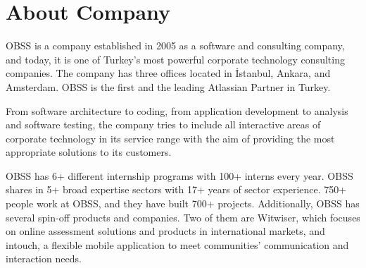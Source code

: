 \section{About Company}

OBSS is a company established in 2005 as a software and consulting company, and today, it is one of Turkey's most powerful corporate technology consulting companies. The company has three offices located in İstanbul, Ankara, and Amsterdam. OBSS is the first and the leading Atlassian Partner in Turkey.

From software architecture to coding, from application development to analysis and software testing, the company tries to include all interactive areas of corporate technology in its service range with the aim of providing the most appropriate solutions to its customers.

OBSS has 6+ different internship programs with 100+ interns every year. OBSS shares in 5+ broad expertise sectors with 17+ years of sector experience. 750+ people work at OBSS, and they have built 700+ projects. Additionally, OBSS has several spin-off products and companies. Two of them are Witwiser, which focuses on online assessment solutions and products in international markets, and intouch, a flexible mobile application to meet communities' communication and interaction needs.
